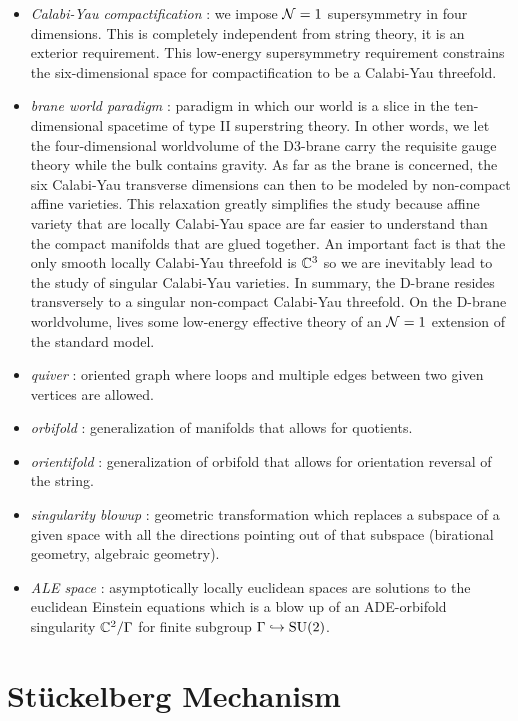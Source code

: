 \documentclass[a4paper,8pt]{article}
\begin{document}
    \begin{itemize}
        \item \emph{Calabi-Yau compactification} : we impose $\mathcal{N}=1$ supersymmetry in four dimensions. This is completely independent from string theory, it is an exterior requirement. This low-energy supersymmetry requirement constrains the six-dimensional space for compactification to be a Calabi-Yau threefold.
        \item \emph{brane world paradigm} : paradigm in which our world is a slice in the ten-dimensional spacetime of type II superstring theory. In other words, we let the four-dimensional worldvolume  of the D3-brane carry the requisite gauge theory while the bulk contains gravity. As far as the brane is concerned, the six Calabi-Yau transverse dimensions can then to be modeled by non-compact affine varieties. This relaxation greatly simplifies the study because affine variety that are locally Calabi-Yau space are far easier to understand than the compact manifolds that are glued together. An important fact is that the only smooth locally Calabi-Yau threefold is $\mathbb{C}^3$ so we are inevitably lead to the study of singular Calabi-Yau varieties. In summary, the D-brane resides transversely to a singular non-compact Calabi-Yau threefold. On the D-brane worldvolume, lives some low-energy effective theory of an $\mathcal{N}=1$ extension of the standard model.
        \item \emph{quiver} : oriented graph where loops and multiple edges between two given vertices are allowed.
        \item \emph{orbifold} : generalization of manifolds that allows for quotients.
        \item \emph{orientifold} : generalization of orbifold that allows for orientation reversal of the string.
        \item \emph{singularity blowup} : geometric transformation which replaces a subspace of a given space with all the directions pointing out of that subspace (birational geometry, algebraic geometry).
        \item \emph{ALE space} : asymptotically locally euclidean spaces are solutions to the euclidean Einstein equations which is a blow up of an ADE-orbifold singularity $\mathbb{C}^2/\Gamma$ for finite subgroup $\Gamma\hookrightarrow\text{SU}(2)$.
    \end{itemize}

\section{Stückelberg Mechanism}
\end{document}
